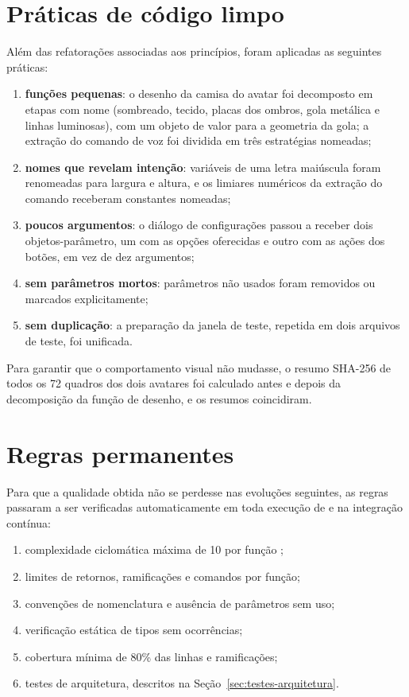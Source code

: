 \section{Práticas de código limpo}

Além das refatorações associadas aos princípios, foram aplicadas as seguintes práticas:

\begin{enumerate}[label=\alph*)]
  \item \textbf{funções pequenas}: o desenho da camisa do avatar foi decomposto em etapas com nome
        (sombreado, tecido, placas dos ombros, gola metálica e linhas luminosas), com um objeto de valor
        para a geometria da gola; a extração do comando de voz foi dividida em três estratégias nomeadas;
  \item \textbf{nomes que revelam intenção}: variáveis de uma letra maiúscula foram renomeadas para
        largura e altura, e os limiares numéricos da extração do comando receberam constantes nomeadas;
  \item \textbf{poucos argumentos}: o diálogo de configurações passou a receber dois objetos-parâmetro,
        um com as opções oferecidas e outro com as ações dos botões, em vez de dez argumentos;
  \item \textbf{sem parâmetros mortos}: parâmetros não usados foram removidos ou marcados explicitamente;
  \item \textbf{sem duplicação}: a preparação da janela de teste, repetida em dois arquivos de teste,
        foi unificada.
\end{enumerate}

Para garantir que o comportamento visual não mudasse, o resumo SHA-256 de todos os 72 quadros dos dois
avatares foi calculado antes e depois da decomposição da função de desenho, e os resumos coincidiram.

\section{Regras permanentes}

Para que a qualidade obtida não se perdesse nas evoluções seguintes, as regras passaram a ser
verificadas automaticamente em toda execução de  e na integração contínua:

\begin{enumerate}[label=\alph*)]
  \item complexidade ciclomática máxima de 10 por função \cite{mccabe1976};
  \item limites de retornos, ramificações e comandos por função;
  \item convenções de nomenclatura e ausência de parâmetros sem uso;
  \item verificação estática de tipos sem ocorrências;
  \item cobertura mínima de 80\% das linhas e ramificações;
  \item testes de arquitetura, descritos na Seção~\ref{sec:testes-arquitetura}.
\end{enumerate}

